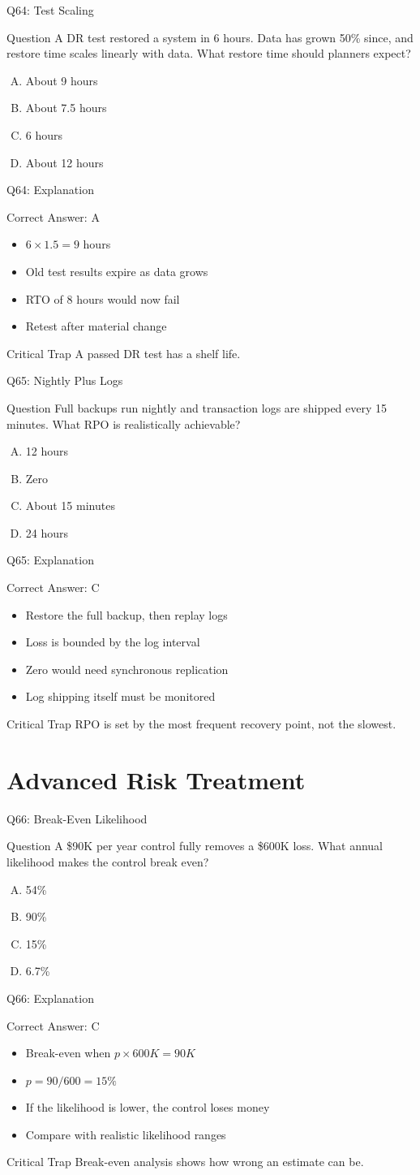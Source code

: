 \documentclass[aspectratio=169]{beamer}
\newcommand{\hq}[7]{%
  \begin{frame}{Q#1: #2}
    \begin{block}{Question}
      #3
    \end{block}
    \begin{enumerate}[(A)]
      #4
    \end{enumerate}
  \end{frame}
  \begin{frame}{Q#1: Explanation}
    \begin{block}{Correct Answer: #5}
      \begin{itemize}
        #6
      \end{itemize}
    \end{block}
    \begin{alertblock}{Critical Trap}
      #7
    \end{alertblock}
  \end{frame}
}
\begin{document}
\hq{64}{Test Scaling}
{A DR test restored a system in 6 hours. Data has grown 50\% since, and restore time scales linearly with data. What restore time should planners expect?}
{\item About 9 hours
 \item About 7.5 hours
 \item 6 hours
 \item About 12 hours}
{A}
{\item $6 \times 1.5 = 9$ hours
 \item Old test results expire as data grows
 \item RTO of 8 hours would now fail
 \item Retest after material change}
{A passed DR test has a shelf life.}

\hq{65}{Nightly Plus Logs}
{Full backups run nightly and transaction logs are shipped every 15 minutes. What RPO is realistically achievable?}
{\item 12 hours
 \item Zero
 \item About 15 minutes
 \item 24 hours}
{C}
{\item Restore the full backup, then replay logs
 \item Loss is bounded by the log interval
 \item Zero would need synchronous replication
 \item Log shipping itself must be monitored}
{RPO is set by the most frequent recovery point, not the slowest.}

\section{Advanced Risk Treatment}

\hq{66}{Break-Even Likelihood}
{A \$90K per year control fully removes a \$600K loss. What annual likelihood makes the control break even?}
{\item 54\%
 \item 90\%
 \item 15\%
 \item 6.7\%}
{C}
{\item Break-even when $p \times 600K = 90K$
 \item $p = 90/600 = 15\%$
 \item If the likelihood is lower, the control loses money
 \item Compare with realistic likelihood ranges}
{Break-even analysis shows how wrong an estimate can be.}
\end{document}
